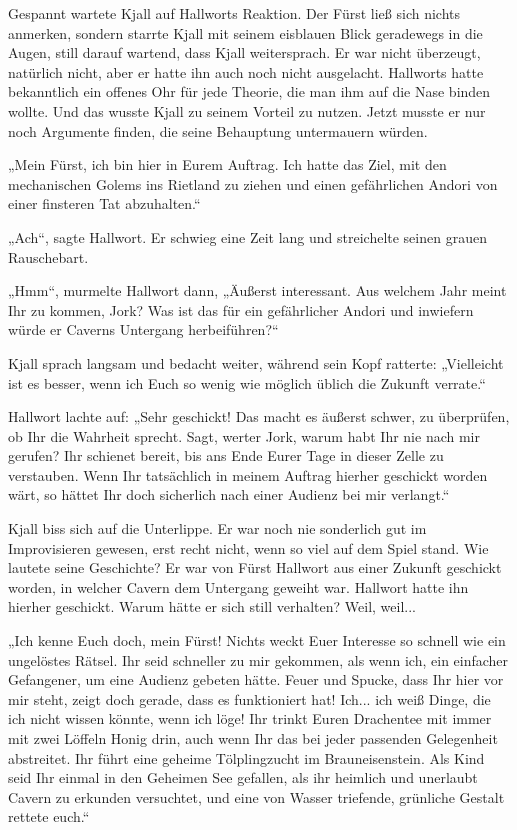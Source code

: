 Gespannt wartete Kjall auf Hallworts Reaktion. Der Fürst ließ sich nichts anmerken, sondern starrte Kjall mit seinem eisblauen Blick geradewegs in die Augen, still darauf wartend, dass Kjall weitersprach. Er war nicht überzeugt, natürlich nicht, aber er hatte ihn auch noch nicht ausgelacht. Hallworts hatte bekanntlich ein offenes Ohr für jede Theorie, die man ihm auf die Nase binden wollte. Und das wusste Kjall zu seinem Vorteil zu nutzen. Jetzt musste er nur noch Argumente finden, die seine Behauptung untermauern würden.

„Mein Fürst, ich bin hier in Eurem Auftrag. Ich hatte das Ziel, mit den mechanischen Golems ins Rietland zu ziehen und einen gefährlichen Andori von einer finsteren Tat abzuhalten.“

„Ach“, sagte Hallwort. Er schwieg eine Zeit lang und streichelte seinen grauen Rauschebart.

„Hmm“, murmelte Hallwort dann, „Äußerst interessant. Aus welchem Jahr meint Ihr zu kommen, Jork? Was ist das für ein gefährlicher Andori und inwiefern würde er Caverns Untergang herbeiführen?“

Kjall sprach langsam und bedacht weiter, während sein Kopf ratterte: „Vielleicht ist es besser, wenn ich Euch so wenig wie möglich üblich die Zukunft verrate.“

Hallwort lachte auf: „Sehr geschickt! Das macht es äußerst schwer, zu überprüfen, ob Ihr die Wahrheit sprecht. Sagt, werter Jork, warum habt Ihr nie nach mir gerufen? Ihr schienet bereit, bis ans Ende Eurer Tage in dieser Zelle zu verstauben. Wenn Ihr tatsächlich in meinem Auftrag hierher geschickt worden wärt, so hättet Ihr doch sicherlich nach einer Audienz bei mir verlangt.“

Kjall biss sich auf die Unterlippe. Er war noch nie sonderlich gut im Improvisieren gewesen, erst recht nicht, wenn so viel auf dem Spiel stand. Wie lautete seine Geschichte? Er war von Fürst Hallwort aus einer Zukunft geschickt worden, in welcher Cavern dem Untergang geweiht war. Hallwort hatte ihn hierher geschickt. Warum hätte er sich still verhalten? Weil, weil...

„Ich kenne Euch doch, mein Fürst! Nichts weckt Euer Interesse so schnell wie ein ungelöstes Rätsel. Ihr seid schneller zu mir gekommen, als wenn ich, ein einfacher Gefangener, um eine Audienz gebeten hätte. Feuer und Spucke, dass Ihr hier vor mir steht, zeigt doch gerade, dass es funktioniert hat! Ich... ich weiß Dinge, die ich nicht wissen könnte, wenn ich löge! Ihr trinkt Euren Drachentee mit immer mit zwei Löffeln Honig drin, auch wenn Ihr das bei jeder passenden Gelegenheit abstreitet. Ihr führt eine geheime Tölplingzucht im Brauneisenstein. Als Kind seid Ihr einmal in den Geheimen See gefallen, als ihr heimlich und unerlaubt Cavern zu erkunden versuchtet, und eine von Wasser triefende, grünliche Gestalt rettete euch.“

